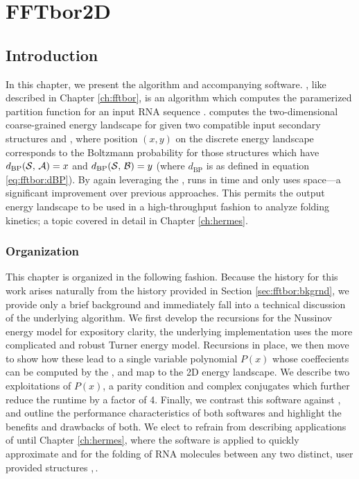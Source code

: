 
\chapter{FFTbor2D}
\label{ch:ffttwo}


\section{Introduction}
\label{sec:ffttwo:intro}

In this chapter, we present the \ffttwo algorithm and accompanying software.
\ffttwo, like \fftbor described in Chapter \ref{ch:fftbor}, is an algorithm
which computes the paramerized partition function for an input RNA sequence
\seq. \ffttwo computes the two-dimensional coarse-grained energy landscape for \seq
given two compatible input secondary structures \strA and \strB, where position
$(x,y)$ on the discrete energy landscape corresponds to the Boltzmann
probability for those structures \str which have $d_{\text{BP}}(\mathcal S,\,\mathcal A)=x$ and
$d_{\text{BP}}(\mathcal S,\,\mathcal B)=y$ (where $d_{\text{BP}}$ is as defined in equation
\ref{eq:fftbor:dBP}). By again leveraging the \fft, \ffttwo runs in 
time and only uses  space---a significant improvement over previous
approaches. This permits the output energy landscape to be used in a
high-throughput fashion to analyze folding kinetics; a topic covered in detail
in Chapter \ref{ch:hermes}.

\subsection{Organization}
\label{subsec:ffttwo:org}

This chapter is organized in the following fashion. Because the history for
this work arises naturally from the history provided in Section
\ref{sec:fftbor:bkgrnd}, we provide only a brief background
and immediately fall into
a technical discussion of the underlying algorithm. We first develop the
recursions for the Nussinov energy model for expository clarity, the
underlying implementation uses the more complicated and robust Turner energy
model. Recursions in place, we then move to show how these lead to
a single variable polynomial $P(x)$ whose coeffecients can be computed by
the \idft, and map to the 2D energy landscape. We describe two exploitations of
$P(x)$, a parity condition and complex conjugates which further reduce the
runtime by a factor of 4. Finally, we contrast this software against \rnatwofold,
and outline the performance characteristics of both softwares and highlight
the benefits and drawbacks of both. We elect to refrain from describing
applications of \ffttwo until Chapter \ref{ch:hermes}, where the software is
applied to quickly approximate \mfpt and \eqt for the folding of RNA molecules
between any two distinct, user provided structures \strA,\,\strB.

